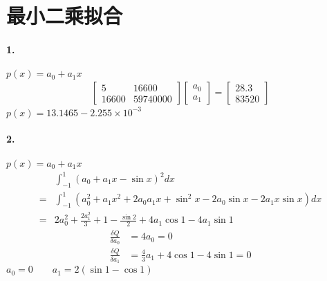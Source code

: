 \documentclass[UTF8]{ctexart}
\begin{document}
	\section{最小二乘拟合}
	\paragraph{1.}
	$p(x)=a_0+a_1x$
	\begin{displaymath}
	\begin{gathered}
		\begin{bmatrix}
			5 & 16600\\
			16600 & 59740000
		\end{bmatrix}
		\begin{bmatrix}
			a_0\\
			a_1
		\end{bmatrix}
		=
		\begin{bmatrix}
			28.3\\
			83520
		\end{bmatrix}
	\end{gathered}
	\end{displaymath}
	$p(x)=13.1465-2.255\times 10^{-3}$
	
	\paragraph{2.}
	$p(x)=a_0+a_1x$
	\begin{displaymath}
		\begin{aligned}
			&\int_{-1}^{1}(a_0+a_1x-\sin x)^2dx\\
			=&\int_{-1}^{1}(a_0^2+a_1x^2+2a_0a_1x+\sin ^2x-2a_0\sin x-2a_1 x\sin x)dx\\
			=&2a_0^2+\frac{2a_1^2}{3}+1-\frac{\sin 2}{2}+4a_1\cos 1-4a_1\sin 1
		\end{aligned}
	\end{displaymath}
	\begin{displaymath}
	\begin{aligned}
		\frac{\delta Q}{\delta a_0}&=4a_0=0\\
		\frac{\delta Q}{\delta a_1}&=\frac{4}{3}a_1+4\cos 1-4\sin 1=0
	\end{aligned}
	\end{displaymath}
	$a_0=0\qquad a_1=2(\sin 1-\cos 1)$
	
\end{document}
